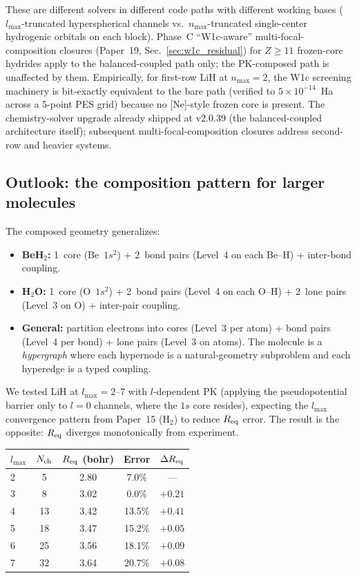 \documentclass[aps,pra,twocolumn,superscriptaddress,longbibliography,floatfix]{revtex4-2}
\begin{document}
These are different solvers in different code paths with different
working bases ($l_{\max}$-truncated hyperspherical channels vs.\
$n_{\max}$-truncated single-center hydrogenic orbitals on each block).
Phase~C ``W1c-aware'' multi-focal-composition closures (Paper~19,
Sec.~\ref{sec:w1c_residual}) for $Z \geq 11$ frozen-core hydrides apply
to the balanced-coupled path only; the PK-composed path is unaffected
by them. Empirically, for first-row LiH at $n_{\max} = 2$, the W1c
screening machinery is bit-exactly equivalent to the bare path
(verified to $5 \times 10^{-14}$~Ha across a 5-point PES grid) because
no [Ne]-style frozen core is present. The chemistry-solver upgrade
already shipped at v2.0.39 (the balanced-coupled architecture itself);
subsequent multi-focal-composition closures address second-row and
heavier systems.

\subsection{Outlook: the composition pattern for larger molecules}
\label{sec:outlook}

The composed geometry generalizes:
\begin{itemize}
  \item \textbf{BeH$_2$:} 1~core (Be~$1s^2$) + 2~bond pairs (Level~4
    on each Be--H) + inter-bond coupling.
  \item \textbf{H$_2$O:} 1~core (O~$1s^2$) + 2~bond pairs (Level~4 on
    each O--H) + 2~lone pairs (Level~3 on O) + inter-pair coupling.
  \item \textbf{General:} partition electrons into cores (Level~3 per
    atom) + bond pairs (Level~4 per bond) + lone pairs (Level~3 on atoms).
    The molecule is a \emph{hypergraph} where each hypernode is a
    natural-geometry subproblem and each hyperedge is a typed coupling.
\end{itemize}

We tested LiH at $l_{\max} = 2$--$7$ with $l$-dependent PK
(applying the pseudopotential barrier only to $l = 0$ channels,
where the $1s$ core resides), expecting the $l_{\max}$
convergence pattern from Paper~15 (H$_2$) to reduce $R_{\rm eq}$
error.  The result is the opposite: $R_{\rm eq}$ diverges
monotonically from experiment.

\begin{center}
\begin{tabular}{lcccc}
\hline
$l_{\max}$ & $N_{\rm ch}$ & $R_{\rm eq}$ (bohr) & Error &
  $\Delta R_{\rm eq}$ \\
\hline
2 &  5 & 2.80 &  7.0\% & --- \\
3 &  8 & 3.02 &  0.0\% & $+0.21$ \\
4 & 13 & 3.42 & 13.5\% & $+0.41$ \\
5 & 18 & 3.47 & 15.2\% & $+0.05$ \\
6 & 25 & 3.56 & 18.1\% & $+0.09$ \\
7 & 32 & 3.64 & 20.7\% & $+0.08$ \\
\hline
\end{tabular}
\end{center}
\end{document}
